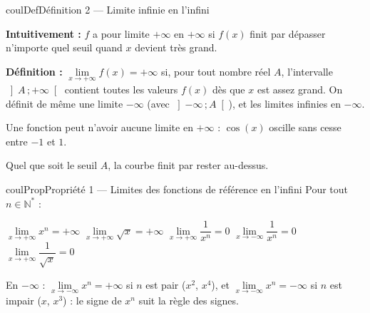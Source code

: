 \documentclass[11pt,a4paper]{article}
\makeatletter
\newcommand{\Ns}{\mathbb{N}^{*}}
\newcommand{\lycee@intoo}[2]{\left]#1\,;#2\right[}
\providecommand{\Cf}{\mathcal{C}\sb{f}}%
\providecommand{\intoo}{\lycee@intoo}%
\newcounter{lycee@signet}
\newcommand{\signet}[3][]{\stepcounter{lycee@signet}%
  \edef\lycee@dest{\if\relax\detokenize{#1}\relax
    signet.\arabic{lycee@signet}\else#1\fi}%
  \hypertarget{\lycee@dest}{}\bookmark[level=#2,dest=\lycee@dest]{#3}}
\newenvironment{definitionbox}[1][Définition]%
  {\begin{boitecours}[phantom={\signet{2}{#1}}]{coulDef}{#1}}{\end{boitecours}}
\newenvironment{proprietebox}[1][Propriété]%
  {\begin{boitecours}[phantom={\signet{2}{#1}}]{coulProp}{#1}}{\end{boitecours}}
\makeatother
\begin{document}
\begin{definitionbox}[Définition 2 --- Limite infinie en l'infini]
\begin{minipage}[c]{0.55\linewidth}\raggedright
\textbf{Intuitivement :} $f$ a pour limite $+\infty$ en $+\infty$ si $f(x)$ finit par
dépasser n'importe quel seuil quand $x$ devient très grand.

\smallskip
\textbf{Définition :} $\lim\limits_{x\to+\infty}f(x)=+\infty$ si, pour tout nombre réel
$A$, l'intervalle $\intoo{A}{+\infty}$ contient toutes les valeurs $f(x)$ dès que $x$
est assez grand. On définit de même une limite $-\infty$ (avec $\intoo{-\infty}{A}$),
et les limites infinies en $-\infty$.

\smallskip
Une fonction peut n'avoir aucune limite en $+\infty$ : $\cos(x)$ oscille sans cesse
entre $-1$ et $1$.
\end{minipage}\hfill
\begin{minipage}[c]{0.42\linewidth}\centering
{}

{\footnotesize Quel que soit le seuil $A$, la courbe finit par rester au-dessus.}
\end{minipage}
\end{definitionbox}

\begin{proprietebox}[Propriété 1 --- Limites des fonctions de référence en l'infini]
Pour tout $n\in\Ns$ :
\begin{center}
$\lim\limits_{x\to+\infty}x^{n}=+\infty$ \qquad
$\lim\limits_{x\to+\infty}\sqrt{x}=+\infty$ \qquad
$\lim\limits_{x\to+\infty}\dfrac{1}{x^{n}}=0$ \qquad
$\lim\limits_{x\to-\infty}\dfrac{1}{x^{n}}=0$ \qquad
$\lim\limits_{x\to+\infty}\dfrac{1}{\sqrt{x}}=0$
\end{center}
En $-\infty$ : $\lim\limits_{x\to-\infty}x^{n}=+\infty$ si $n$ est pair ($x^{2}$, $x^{4}$),
et $\lim\limits_{x\to-\infty}x^{n}=-\infty$ si $n$ est impair ($x$, $x^{3}$) : le signe
de $x^{n}$ suit la règle des signes.
\end{proprietebox}
\end{document}

